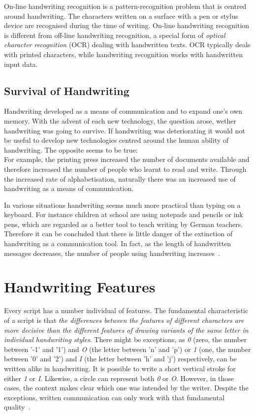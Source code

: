 On-line handwriting recognition is a pattern-recognition problem that is centred
around handwriting. The characters written on a surface with a pen or stylus
device are recognised during the time of writing.
On-line handwriting recognition is different from 
off-line handwriting recognition, a special form of 
\emph{optical character recognition} (OCR) dealing with handwritten texts.
OCR typically deals with printed characters, while handwriting recognition
works with handwritten input data.


\subsection{Survival of Handwriting}
\label{sec:survivalofhandwriting}

Handwriting developed as a means of communication and to expand one's own
memory. With the advent of each new technology, the question arose, 
wether handwriting was going to survive. 
If handwriting was deteriorating it would not be useful to develop new
technologies centred around the human ability of handwriting.
The opposite seems to be true: \\
For example, the printing press increased the number of documents
available and therefore increased the number of people who learnt to read
and write. Through the increased rate of alphabetisation, naturally there was
an increased use of handwriting as a means of communication.

In various situations handwriting seems much more practical than typing on a
keyboard. For instance children at school are using notepads and pencils or
ink pens, which are regarded as a better tool to teach writing by German 
teachers. Therefore it can be concluded that there is little danger of
the extinction of handwriting as a communication tool. In fact, as 
the length of handwritten messages decreases, the number of people using 
handwriting increases~.

\section{Handwriting Features}
\label{sec:handwritingfeatures}

Every script has a number individual of features. The fundamental 
characteristic of a script is that \emph{the differences between the features
of different characters are more decisive than the different features of 
drawing variants of the same letter in individual handwriting styles}.
There might be exceptions, as \emph{0} (zero, the number between '-1' and '1') 
and \emph{O} (the letter between 'n' and 'p') or \emph{1} (one, the number 
between '0' and '2') and \emph{I} (the letter between 'h' and 'j') respectively, 
can be written alike in handwriting. 
It is possible to write a short vertical stroke for either
\emph{1} or \emph{I}. Likewise, a circle can represent both \emph{0} or \emph{O}.
However, in those cases, the context makes clear which one was intended by the 
writer. Despite the exceptions, written communication can only work with that
fundamental quality~.

